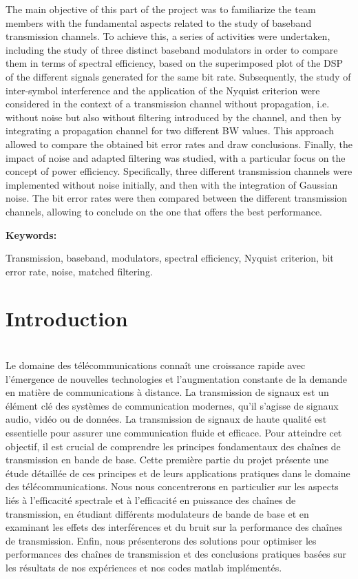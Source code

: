 \documentclass[11pt]{article}
\begin{document}
The main objective of this part of the project was to familiarize the team members with the fundamental aspects related to the study of baseband transmission channels. To achieve this, a series of activities were undertaken, including the study of three distinct baseband modulators in order to compare them in terms of spectral efficiency, based on the superimposed plot of the DSP of the different signals generated for the same bit rate. Subsequently, the study of inter-symbol interference and the application of the Nyquist criterion were considered in the context of a transmission channel without propagation, i.e. without noise but also without filtering introduced by the channel, and then by integrating a propagation channel for two different BW values. This approach allowed to compare the obtained bit error rates and draw conclusions. Finally, the impact of noise and adapted filtering was studied, with a particular focus on the concept of power efficiency. Specifically, three different transmission channels were implemented without noise initially, and then with the integration of Gaussian noise. The bit error rates were then compared between the different transmission channels, allowing to conclude on the one that offers the best performance.

{\bfseries Keywords:}

Transmission, baseband, modulators, spectral efficiency, Nyquist criterion, bit error rate, noise, matched filtering.

\newpage
\tableofcontents
\listoffigures

\newpage
\section{Introduction} 
\\[10mm]
Le domaine des télécommunications connaît une croissance rapide avec l'émergence de nouvelles technologies et l'augmentation constante de la demande en matière de communications à distance. La transmission de signaux est un élément clé des systèmes de communication modernes, qu'il s'agisse de signaux audio, vidéo ou de données. La transmission de signaux de haute qualité est essentielle pour assurer une communication fluide et efficace. Pour atteindre cet objectif, il est crucial de comprendre les principes fondamentaux des chaînes de transmission en bande de base. Cette première partie du projet présente une étude détaillée de ces principes et de leurs applications pratiques dans le domaine des télécommunications. Nous nous concentrerons en particulier sur les aspects liés à l'efficacité spectrale et à l'efficacité en puissance des chaînes de transmission, en étudiant différents modulateurs de bande de base et en examinant les effets des interférences et du bruit sur la performance des chaînes de transmission. Enfin, nous présenterons des solutions pour optimiser les performances des chaînes de transmission et des conclusions pratiques basées sur les résultats de nos expériences et nos codes matlab implémentés.\\ [15mm]
\end{document}
